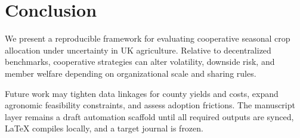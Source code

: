 \section{Conclusion}
\label{sec:conclusion}

We present a reproducible framework for evaluating cooperative seasonal crop allocation under
uncertainty in UK agriculture.
\coppercontrib{}
Relative to decentralized benchmarks, cooperative strategies can alter volatility, downside
risk, and member welfare depending on organizational scale and sharing rules.

Future work may tighten data linkages for county yields and costs, expand agronomic feasibility
constraints, and assess adoption frictions.
The manuscript layer remains a draft automation scaffold until all required outputs are synced,
LaTeX compiles locally, and a target journal is frozen.
